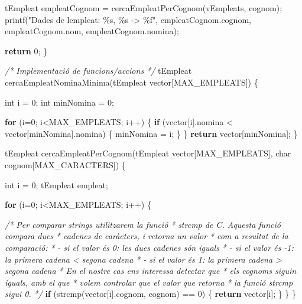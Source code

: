 \documentclass[]{book}
\newenvironment{Shaded}{\begin{snugshade}}{\end{snugshade}}
\newcommand{\CommentTok}[1]{\textcolor[rgb]{0.56,0.35,0.01}{\textit{#1}}}
\newcommand{\ControlFlowTok}[1]{\textcolor[rgb]{0.13,0.29,0.53}{\textbf{#1}}}
\newcommand{\DataTypeTok}[1]{\textcolor[rgb]{0.13,0.29,0.53}{#1}}
\newcommand{\DecValTok}[1]{\textcolor[rgb]{0.00,0.00,0.81}{#1}}
\newcommand{\NormalTok}[1]{#1}
\newcommand{\StringTok}[1]{\textcolor[rgb]{0.31,0.60,0.02}{#1}}
\begin{document}
\begin{Shaded}
\begin{Highlighting}[]
\NormalTok{    tEmpleat empleatCognom = cercaEmpleatPerCognom(vEmpleats, cognom);}
\NormalTok{    printf(}\StringTok{"Dades de l\textquotesingle{}empleat: \%s, \%s {-}\textgreater{} \%f"}\NormalTok{, empleatCognom.cognom, empleatCognom.nom, empleatCognom.nomina);}

    \ControlFlowTok{return} \DecValTok{0}\NormalTok{;}
\NormalTok{\}}

\CommentTok{/* Implementació de funcions/accions */}
\NormalTok{tEmpleat cercaEmpleatNominaMinima(tEmpleat vector[MAX\_EMPLEATS]) \{}

    \DataTypeTok{int}\NormalTok{ i = }\DecValTok{0}\NormalTok{; }
    \DataTypeTok{int}\NormalTok{ minNomina = }\DecValTok{0}\NormalTok{;}

    \ControlFlowTok{for}\NormalTok{ (i=}\DecValTok{0}\NormalTok{; i\textless{}MAX\_EMPLEATS; i++) \{}
        \ControlFlowTok{if}\NormalTok{ (vector[i].nomina \textless{} vector[minNomina].nomina) \{}
\NormalTok{            minNomina = i;}
\NormalTok{        \}}
\NormalTok{    \}}
    \ControlFlowTok{return}\NormalTok{ vector[minNomina];}
\NormalTok{\}}

\NormalTok{tEmpleat cercaEmpleatPerCognom(tEmpleat vector[MAX\_EMPLEATS], }\DataTypeTok{char}\NormalTok{ cognom[MAX\_CARACTERS]) \{}

    \DataTypeTok{int}\NormalTok{ i = }\DecValTok{0}\NormalTok{; }
\NormalTok{    tEmpleat empleat;}

    \ControlFlowTok{for}\NormalTok{ (i=}\DecValTok{0}\NormalTok{; i\textless{}MAX\_EMPLEATS; i++) \{}

        \CommentTok{/* Per comparar strings utilitzarem la funció}
\CommentTok{         *  strcmp de C. Aquesta funció compara dues}
\CommentTok{         *  cadenes de caràcters, i retorna un valor}
\CommentTok{         *  com a resultat de la comparació:}
\CommentTok{         *  {-} si el valor és 0: les dues cadenes són iguals}
\CommentTok{         *  {-} si el valor és {-}1: la primera cadena \textless{} segona cadena}
\CommentTok{         *  {-} si el valor és 1: la primera cadena \textgreater{} segona cadena}
\CommentTok{         *  En el nostre cas ens interessa detectar que}
\CommentTok{         *  els cognoms siguin iguals, amb el que }
\CommentTok{         *  volem controlar que el valor que retorna}
\CommentTok{         *  la funció strcmp sigui 0. }
\CommentTok{         */}
        \ControlFlowTok{if}\NormalTok{ (strcmp(vector[i].cognom, cognom) == }\DecValTok{0}\NormalTok{) \{}
            \ControlFlowTok{return}\NormalTok{ vector[i];}
\NormalTok{        \}}
\NormalTok{    \}}
\NormalTok{\}}
\end{Highlighting}
\end{Shaded}
\end{document}
